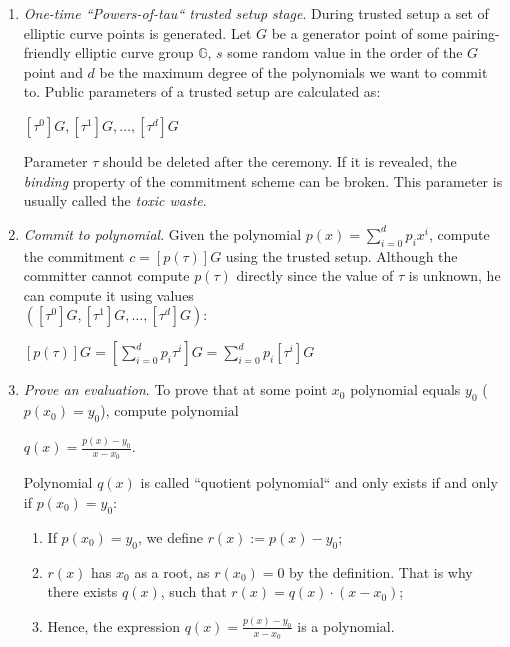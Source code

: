 \documentclass[../lecture-notes.tex]{subfiles}
\begin{document}
\begin{enumerate}
    \item \textit{One-time ``Powers-of-tau`` trusted setup stage}. During trusted setup a set of elliptic curve points is generated. 
    Let $G$ be a generator point of some pairing-friendly
    elliptic curve group $\mathbb{G}$, $s$ some random value in the order of the $G$ point and $d$ be the maximum degree 
    of the polynomials we want to commit to.
    Public parameters of a trusted setup are calculated as:

    \begin{center}
        $[\tau^0]G, [\tau^1]G, \ldots, [\tau^d]G$
    \end{center}

    Parameter $\tau$ should be deleted after the ceremony. If it is revealed, the \textit{binding} property of the commitment scheme can be broken. 
    This parameter is usually called the \textit{toxic waste}.
    
    \item \textit{Commit to polynomial}. Given the polynomial $p(x) = \sum_{i = 0}^{d} p_i x^i$, compute the commitment $c = [p(\tau)]G $ 
    using the trusted setup. Although the committer cannot compute $p(\tau)$ directly since the value of $\tau$ is unknown, he can
    compute it using values \\ $([\tau^0]G, [\tau^1]G, \ldots, [\tau^d]G)$:
    
    \begin{center}
       $ [p(\tau)]G = [\sum_{i=0}^{d} p_i \tau^i]G = \sum_{i=0}^{d}p_i[\tau^i]G$
    \end{center}
    
    \item \textit{Prove an evaluation}. To prove that at some point $x_0$ polynomial equals $y_0$ ($p(x_0) = y_0$), compute polynomial
    
    \begin{center}
        $q(x) = \frac{p(x) - y_0}{x - x_0}$.
    \end{center}

    Polynomial $q(x)$ is called ``quotient polynomial`` and only exists if and only if $p(x_0) = y_0$:
    \begin{enumerate}
        \item If $p(x_0) = y_0$, we define $r(x) := p(x) - y_0$;
        \item $r(x)$ has $x_0$ as a root, as $r(x_0) = 0$ by the definition. 
            That is why there exists $q(x)$, such that $r(x) = q(x)\cdot (x-x_0)$;
        \item Hence, the expression $q(x) = \frac{p(x) - y_0}{x-x_0}$ is a polynomial.
    \end{enumerate}
    

\end{enumerate}
\end{document}
